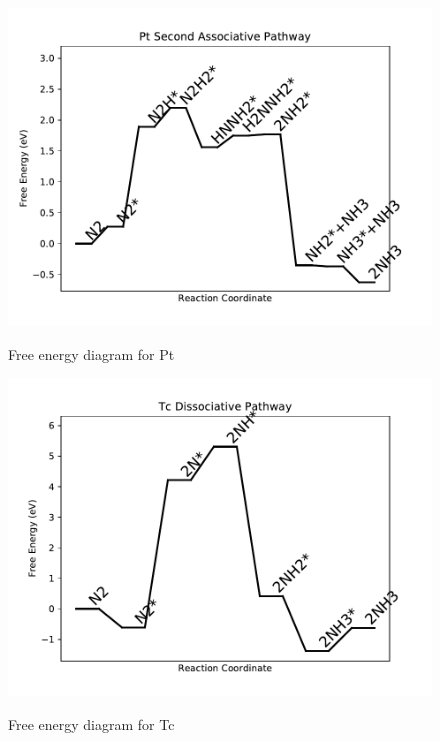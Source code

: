 \documentclass{article}
\begin{document}
\newpage
\begin{figure}
\includegraphics[width=1\linewidth]{data/plots/Pt_associative_2.pdf}
\label{fig:Pt_associative_2}
\caption{Free energy diagram for Pt}
\end{figure}

\begin{figure}
\includegraphics[width=1\linewidth]{data/plots/Tc_dissociative.pdf}
\label{fig:Tc_dissociative}
\caption{Free energy diagram for Tc}
\end{figure}
\end{document}
